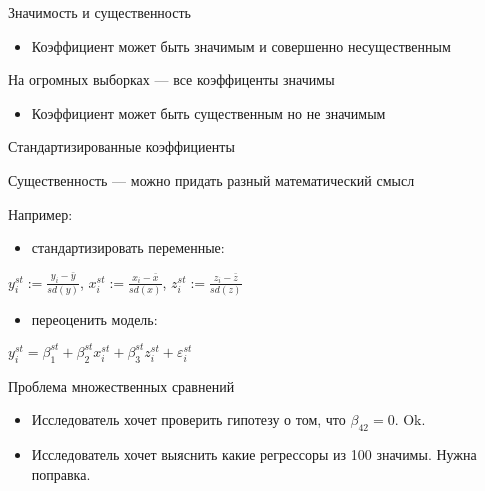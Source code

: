 \documentclass[ignorenonframetext,]{beamer}
\begin{document}
\begin{frame}{Значимость и существенность}

\begin{itemize}
\itemsep1pt\parskip0pt
\item
  Коэффициент может быть значимым и совершенно несущественным
\end{itemize}

На огромных выборках --- все коэффиценты значимы

\begin{itemize}
\itemsep1pt\parskip0pt
\item
  Коэффициент может быть существенным но не значимым
\end{itemize}

\end{frame}

\begin{frame}{Стандартизированные коэффициенты}

Существенность --- можно придать разный математический смысл

Например:

\begin{itemize}
\itemsep1pt\parskip0pt
\item
  стандартизировать переменные:
\end{itemize}

$y^{st}_i:= \frac{y_i-\bar{y}}{sd(y)}$,
$x^{st}_i:= \frac{x_i-\bar{x}}{sd(x)}$,
$z^{st}_i:= \frac{z_i-\bar{z}}{sd(z)}$

\begin{itemize}
\itemsep1pt\parskip0pt
\item
  переоценить модель:
\end{itemize}

$y^{st}_i=\beta_1^{st}+\beta_2^{st}x_i^{st}+\beta_3^{st}z_i^{st}+\varepsilon_i^{st}$

\end{frame}

\begin{frame}{Проблема множественных сравнений}

\begin{itemize}
\item
  Исследователь хочет проверить гипотезу о том, что $\beta_{42}=0$. Ok.
\item
  Исследователь хочет выяснить какие регрессоры из 100 значимы. Нужна
  поправка.
\end{itemize}

\end{frame}
\end{document}
